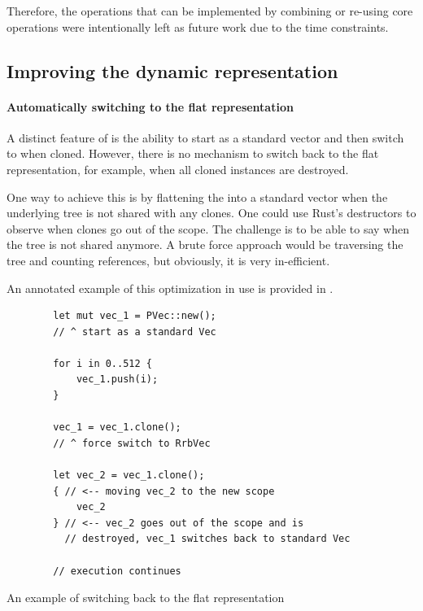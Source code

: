 Therefore, the operations that can be implemented by combining or re-using core operations were intentionally left as future work due to the time constraints.

\subsection{Improving the dynamic representation}

\paragraph{Automatically switching to the flat representation}
A distinct feature of \pvec{} is the ability to start as a standard vector and then switch to \rrbvec{} when cloned. However, there is no mechanism to switch back to the flat representation, for example, when all cloned instances are destroyed.

One way to achieve this is by flattening the \rrbtree{} into a standard vector when the underlying tree is not shared with any clones. One could use Rust's destructors to observe when \pvec{} clones go out of the scope. The challenge is to be able to say when the tree is not shared anymore. A brute force approach would be traversing the tree and counting references, but obviously, it is very in-efficient.

An annotated example of this optimization in use is provided in .

\begin{listing}[H]

    \centering
    \begin{verbatim}
        let mut vec_1 = PVec::new();
        // ^ start as a standard Vec

        for i in 0..512 {
            vec_1.push(i);
        }

        vec_1 = vec_1.clone();
        // ^ force switch to RrbVec

        let vec_2 = vec_1.clone();
        { // <-- moving vec_2 to the new scope
            vec_2
        } // <-- vec_2 goes out of the scope and is
          // destroyed, vec_1 switches back to standard Vec

        // execution continues
    \end{verbatim}

    \caption{An example of switching back to the flat representation}
    \label{lst:switching-to-flat}
\end{listing}

